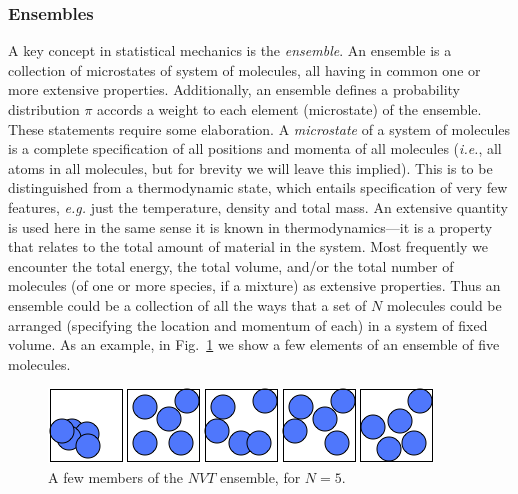 \documentclass[]{article}
\begin{document}
\subsubsection{Ensembles}\label{ensembles}

A key concept in statistical mechanics is the \emph{ensemble}. An
ensemble is a collection of microstates of system of molecules, all
having in common one or more extensive properties. Additionally, an
ensemble defines a probability distribution $\pi$ accords a weight to each
element (microstate) of the ensemble. These statements require some
elaboration. A \emph{microstate} of a system of molecules is a complete
specification of all positions and momenta of all molecules
(\emph{i.e.}, all atoms in all molecules, but for brevity we will leave
this implied). This is to be distinguished from a thermodynamic state,
which entails specification of very few features, \emph{e.g.} just the
temperature, density and total mass. An extensive quantity is used here
in the same sense it is known in thermodynamics---it is a property that
relates to the total amount of material in the system. Most frequently
we encounter the total energy, the total volume, and/or the total number
of molecules (of one or more species, if a mixture) as extensive
properties. Thus an ensemble could be a collection of all the ways that
a set of $N$ molecules could be arranged (specifying the location
and momentum of each) in a system of fixed volume. As an example, in
Fig.~\ref{fig:NVT} we show a few elements of an ensemble of five molecules.
\begin{figure}
\includegraphics[width=\textwidth]{StatMech_figures/image001}
\caption{\label{fig:NVT}A few members of the $NVT$ ensemble, for $N = 5$.}
\end{figure}
\end{document}
